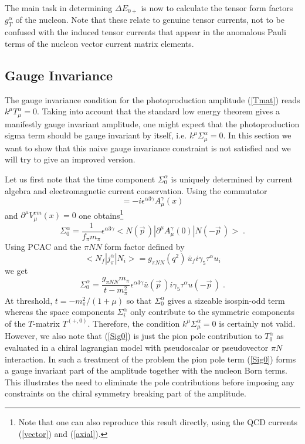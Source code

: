 The main task in determining $\Delta E_{0+}$ is now to calculate the 
tensor form factors $g_T^{\alpha}$ of the nucleon. Note that these
relate to genuine tensor currents, not to be confused with the induced
tensor currents that appear in the anomalous Pauli terms of the nucleon
vector current matrix elements.       

\subsection{Gauge Invariance}
The gauge invariance condition for the photoproduction amplitude (\ref{Tmat})
reads $k^{\mu}T_\mu^\alpha =0$. Taking into account that the standard 
low energy theorem \cite{Bae} gives a manifestly gauge invariant amplitude,
one might expect that the photoproduction sigma term should be gauge
invariant by itself, i.e. $k^\mu \Sigma^\alpha_\mu = 0$. In this section 
we want to show that this naive gauge invariance constraint is not
satisfied and we will try to give an improved version. 

Let us first note that the time component $\Sigma_0^\alpha$ 
is uniquely determined by current
algebra and electromagnetic current conservation. Using the commutator
\begin{equation}
 [Q_5^\alpha ,V_\mu^{em}(x)] =-i\epsilon^{\alpha 3 \gamma} A_\mu^\gamma (x)
\end{equation}
and $\partial^\mu V_\mu^{em}(x)=0$ one obtains\footnote{Note that one can
also reproduce this result directly, using the QCD currents (\ref{vector})
and (\ref{axial}).} 
\begin{equation}
\Sigma_0^\alpha =\frac{1}{f_\pi m_\pi}\epsilon^{\alpha 3 \gamma}
 <N(\vec{p}\,)|\partial^\mu A_\mu^\gamma (0) |N(-\vec{p}\,)> \; . 
\end{equation} 
Using PCAC and the $\pi NN$ form factor defined by
\begin{equation}
 <N_f| j_\pi^\alpha|N_i> = g_{\pi{\scriptscriptstyle NN}} (q^2)
 \, \bar{u}_f i\gamma_5 \tau^\alpha u_i
\end{equation}  
we get 
\begin{equation}
\label{Sig0}
 \Sigma_0^\alpha = \frac{g_{\pi{\scriptscriptstyle NN}}
 m_\pi}{t-m_\pi^2}\epsilon^{\alpha 3 \gamma}
 \bar{u}(\vec{p}\,)i\gamma_5\tau^\alpha u(-\vec{p}\,) \; .
\end{equation}
At threshold, $t=-m_\pi^2/(1+\mu)$ so that $\Sigma_0^\alpha$ gives a 
sizeable isospin-odd term
whereas the space components $\Sigma_i^\alpha$ only contribute to
the symmetric components of the $T$-matrix $T^{(+,0)}$. Therefore, 
the  condition $k^\mu \Sigma^\alpha_\mu=0$ is certainly not valid. However, 
we also note that (\ref{Sig0}) is just the pion
pole contribution to $T_0^\alpha$ as evaluated in a  chiral lagrangian model
with pseudoscalar or pseudovector $\pi N$ interaction. In such a treatment
of the problem the pion pole term (\ref{Sig0}) forms a gauge invariant part of 
the amplitude together with the nucleon Born terms.  This illustrates the need 
to eliminate the pole contributions before imposing any constraints on
the chiral symmetry breaking part of the amplitude.

